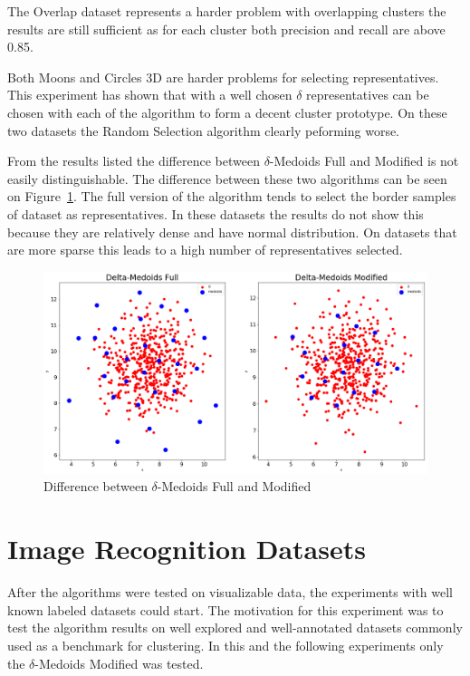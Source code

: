 \documentclass[thesis=B,english]{FITthesis}[2012/10/20]
\begin{document}
The Overlap dataset represents a harder problem with overlapping clusters the results are still sufficient as for each cluster both precision and recall are above 0.85.

Both Moons and Circles 3D are harder problems for selecting representatives.
This experiment has shown that with a well chosen $\delta$ representatives can be chosen with each of the algorithm to form a decent cluster prototype.
On these two datasets the Random Selection algorithm clearly peforming worse. 

From the results listed the difference between $\delta$-Medoids Full and Modified is not easily distinguishable.
The difference between these two algorithms can be seen on Figure~\ref{img:difference_modified}.
The full version of the algorithm tends to select the border samples of dataset as representatives.
In these datasets the results do not show this because they are relatively dense and have normal distribution.
On datasets that are more sparse this leads to a high number of representatives selected.

\begin{figure}[t]
   \includegraphics[width=\linewidth]{img/delta_medoids_select.png}
  \caption{Difference between $\delta$-Medoids Full and Modified}
  \label{img:difference_modified}
\end{figure}

\section{Image Recognition Datasets}\label{sec:exp3}

After the algorithms were tested on visualizable data, the experiments with well known labeled datasets could start.
The motivation for this experiment was to test the algorithm results on well explored and well-annotated datasets commonly used as a benchmark for clustering.
In this and the following experiments only the $\delta$-Medoids Modified was tested. 
\end{document}
